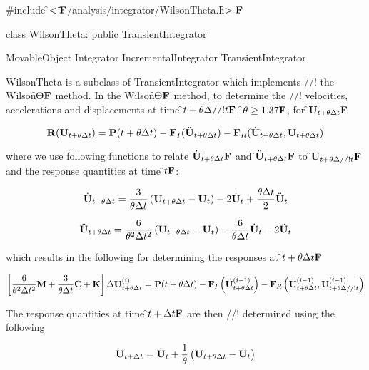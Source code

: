 
\indent \#include \f$<\tilde{ }{\bf F}$/analysis/integrator/WilsonTheta.h\f$>{\bf F}$

\indent class WilsonTheta: public TransientIntegrator

\indent MovableObject
\indent\indent Integrator
\indent\indent\indent IncrementalIntegrator
\indent\indent\indent\indent TransientIntegrator
\indent\indent\indent\indent{}

\indent WilsonTheta is a subclass of TransientIntegrator which implements
//! the Wilson\f$\Theta{\bf F}$ method. In the Wilson\f$\Theta{\bf F}$ method, to determine the 
//! velocities, accelerations and displacements at time \f$t + \theta \Delta
//! t{\bf F}$, \f$\theta \ge 1.37{\bf F}$, for \f${\bf U}_{t+ \theta \Delta t}{\bf F}$ 

\[ {\bf R} ({\bf U}_{t + \theta \Delta t}) = {\bf P}(t + \theta \Delta t) -
{\bf F}_I(\ddot{\bf U}_{t+ \theta \Delta t}) 
- {\bf F}_R(\dot{\bf U}_{t + \theta \Delta t},{\bf U}_{t + \theta \Delta t}) \]

\noindent where we use following functions to relate \f$\dot{\bf U}_{t + \theta
\Delta t}{\bf F}$ and \f$\ddot{\bf U}_{t + \theta \Delta t}{\bf F}$ to \f${\bf U}_{t + \theta \Delta
//! t}{\bf F}$ and the response quantities at time \f$t{\bf F}$:

\[
\dot {{\bf U}}_{t + \theta \Delta t} = \frac{3}{\theta \Delta t} \left(
{\bf U}_{t + \theta \Delta t} - {\bf U}_t \right)
 - 2 \dot {{\bf U}}_t + \frac{\theta \Delta t}{2} \ddot {{\bf U}}_t 
\]

\[
\ddot {{\bf U}}_{t + \theta \Delta t} = \frac{6}{\theta^2 \Delta t^2}
\left( {\bf U}_{t+\theta \Delta t} - {\bf U}_t \right)
 - \frac{6}{\theta \Delta t} \dot {{\bf U}}_t -2 \ddot{\bf U}_t
\]

\noindent which  results in the following for determining the responses at
\f$t + \theta \Delta t{\bf F}$ 

\[ \left[ \frac{6}{\theta^2 \Delta t^2} {\bf M} + \frac{3}{\theta \Delta t}
{\bf C} + {\bf K} \right] \Delta {\bf U}_{t + \theta \Delta t}^{(i)} = {\bf P}(t + \theta
\Delta t) - {\bf F}_I\left(\ddot{\bf U}_{t+\theta \Delta  t}^{(i-1)}\right) 
- {\bf F}_R\left(\dot{\bf U}_{t + \theta \Delta t}^{(i-1)},{\bf U}_{t + \theta \Delta
//! t}^{(i-1)}\right) \]


\noindent The response quantities at time \f$t + \Delta t{\bf F}$ are then
//! determined using the following

\[
\ddot{\bf U}_{t + \Delta t} = \ddot{\bf U}_t + \frac{1}{\theta} \left( \ddot{\bf U}_{t +
\theta \Delta t} - \ddot{\bf U}_t \right)
\]

